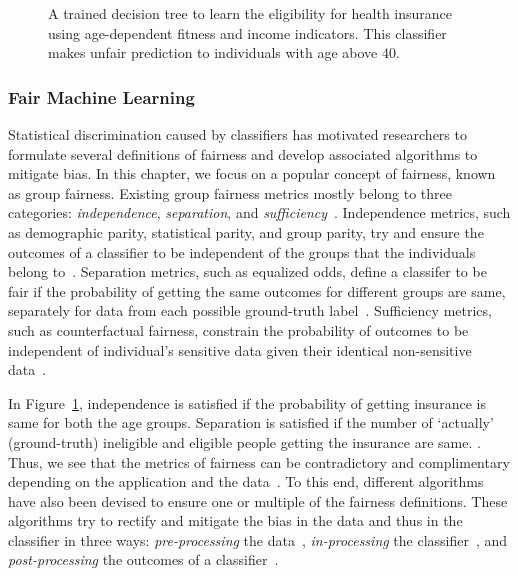\begin{figure}[!t]
{{
		}
	}
	\caption[A decision tree classifier on sensitive and non-sensitive features]{A trained decision tree to learn the eligibility for health insurance using age-dependent fitness and income indicators. This classifier makes unfair prediction to individuals with age above $ 40 $.}\label{fairness_justicia_fig:fair_example}%
\end{figure}


\subsubsection{Fair Machine Learning} Statistical discrimination caused by classifiers has motivated researchers to formulate several definitions of fairness and develop associated algorithms to mitigate bias. In this chapter, we focus on a popular concept of fairness, known as group fairness. Existing group fairness metrics mostly belong to three categories: \textit{independence}, \textit{separation}, and \textit{sufficiency}~\cite{mehrabi2019survey}. Independence metrics, such as demographic parity, statistical parity, and group parity, try and ensure the outcomes of a classifier to be independent of the groups that the individuals belong to~\cite{feldman2015certifying,dwork2012fairness}. Separation metrics, such as equalized odds, define a classifer to be fair if the probability of getting the same outcomes for different groups are same, separately for data from each possible ground-truth label~\cite{hardt2016equality}. Sufficiency metrics, such as counterfactual fairness, constrain the probability of outcomes to be independent of individual's sensitive data given their identical non-sensitive data~\cite{kusner2017counterfactual}.

In Figure~\ref{fairness_justicia_fig:fair_example}, independence is satisfied if the probability of getting insurance is same for both the age groups. Separation is satisfied if the number of `actually' (ground-truth) ineligible and eligible people getting the insurance are same. . Thus, we see that the metrics of fairness can be contradictory and complimentary depending on the application and the data~\cite{corbett2018measure}. To this end, different algorithms have also been devised to ensure one or multiple of the fairness definitions. These algorithms try to rectify and mitigate the bias in the data and thus in the classifier in three ways: \textit{pre-processing} the data~\cite{kamiran2012data,zemel2013learning,calmon2017optimized}, \textit{in-processing} the classifier~\cite{zhang2018mitigating}, and \textit{post-processing} the outcomes of a classifier~\cite{kamiran2012decision,hardt2016equality}.


